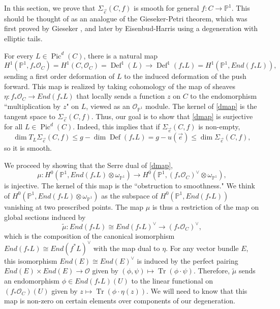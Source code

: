 \documentclass[12pt]{amsart}
\newcommand{\pp}{\mathbb{P}}
\renewcommand{\O}{\mathscr{O}}
\renewcommand{\tilde}{\widetilde}
\DeclareMathOperator{\Pic}{Pic}
\DeclareMathOperator{\Def}{Def}
\DeclareMathOperator{\tr}{Tr}
\newcommand{\e}{\vec{e}}
\theoremstyle{definition}
\theoremstyle{remark}
\theoremstyle{remark}
\numberwithin{equation}{section}
\begin{document}
In this section, we prove that $\Sigma_{\vec{e}}(C, f)$ is smooth for general $f\colon  C \rightarrow \pp^1$. This should be thought of as an analogue of the Gieseker-Petri theorem, which was first proved by Gieseker \cite{G}, and later by Eisenbud-Harris \cite{EH2} using a degeneration with elliptic tails.

For every $L \in \Pic^d(C)$, there is a natural map
\begin{equation} \label{dmap}
H^1(\pp^1, f_*\O_C) =H^1(C, \O_C) = \Def^1(L) \rightarrow \Def^1(f_*L) = H^1(\pp^1, End(f_*L)),
\end{equation}
sending a first order deformation of $L$ to the induced deformation of the push forward. This map is realized by taking cohomology of the map of sheaves $\eta: f_*\O_C \rightarrow End(f_*L)$ that locally sends a function $z$ on $C$ to the endomorphism ``multiplication by $z$" on $L$, viewed as an $\O_{\pp^1}$ module.
The kernel of \eqref{dmap} is the tangent space to $\Sigma_{\vec{e}}(C, f)$.
Thus, our goal is to show that \eqref{dmap} is surjective for all $L \in \Pic^d(C)$. Indeed, this implies that if $\Sigma_{\vec{e}}(C, f)$ is non-empty, 
\[\dim T_L \Sigma_{\e}(C, f) \leq g - \dim \Def(f_*L) = g - u(\vec{e}) \leq \dim \Sigma_{\vec{e}}(C, f),\]
so it is smooth.

We proceed by showing that the Serre dual of \eqref{dmap},
\begin{equation} \label{sd}
\mu: H^0(\pp^1, End(f_*L) \otimes \omega_{\pp^1}) \rightarrow H^0(\pp^1, (f_*\O_C)^\vee \otimes \omega_{\pp^1}),
\end{equation}
is injective. The kernel of this map is the ``obstruction to smoothness." We think of $H^0(\pp^1, End(f_*L) \otimes \omega_{\pp^1})$ as the subspace of $H^0(\pp^1, End(f_*L))$ vanishing at two prescribed points. The map $\mu$ is thus a restriction of the map on global sections induced by
\[\tilde{\mu}: End(f_*L) \cong End(f_*L)^\vee \to (f_* \O_C)^\vee,\]
which is the composition of the canonical isomorphism $End(f_*L) \cong End(f^*L)^\vee$ with the map dual to $\eta$. For any vector bundle $E$, this isomorphism
$End(E) \cong End(E)^\vee$
 is induced by the perfect pairing $End(E) \times End(E) \to \O$ given by $(\phi, \psi) \mapsto \tr(\phi \cdot \psi)$. Therefore, $\tilde{\mu}$ sends
an endomorphism $\phi \in End(f_*L)(U)$ to the linear functional on $(f_*\O_C)(U)$ given by $z \mapsto \tr(\phi  \cdot \eta(z))$. We will need to know that this map is non-zero on certain elements over components of our degeneration.
\end{document}
